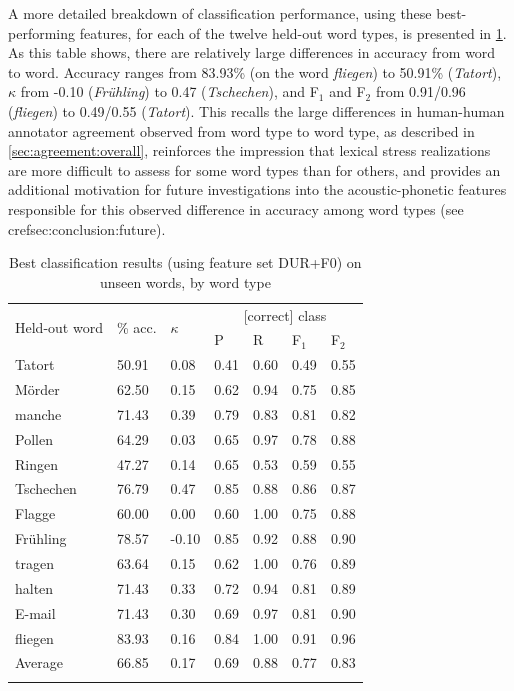 	
	A more detailed breakdown of classification performance, using these best-performing features, for each of the twelve held-out word types, is presented in \cref{tab:results:wordtypes}. As this table shows, there are relatively large differences in accuracy from word to word. Accuracy ranges from 83.93\% (on the word \textit{fliegen}) to 50.91\% (\textit{Tatort}), $\kappa$ from -0.10 (\textit{Fr\"uhling}) to 0.47 (\textit{Tschechen}), and F$_1$ and F$_2$ from 0.91/0.96 (\textit{fliegen}) to 0.49/0.55 (\textit{Tatort}). This recalls the large differences in human-human annotator agreement observed from word type to word type, as described in \cref{sec:agreement:overall}, reinforces the impression that lexical stress realizations are more difficult to assess for some word types than for others, and provides an additional motivation for future investigations into the acoustic-phonetic features responsible for this observed difference in accuracy among word types (see cref{sec:conclusion:future}).
	
	
	
		\begin{table}
			\centering
			\caption[Best classification results on unseen words, by word type]{Best classification results (using feature set DUR+F0) on unseen words, by word type  }
			\begin{tabularx}{\textwidth}{lXXXXXX}			
			\toprule
			\multirow{2}{*}{Held-out word} & \multirow{2}{*}{\% acc.} & \multirow{2}{*}{$\kappa$} & \multicolumn{4}{c}{[correct] class} \\
			\cmidrule(lr){4-7}
			& & & P & R & F$_1$ & F$_2$ \\
			\midrule
Tatort	&	50.91	&	0.08	&	0.41	&	0.60	&	0.49	&	0.55	\\
M\"order	&	62.50	&	0.15	&	0.62	&	0.94	&	0.75	&	0.85	\\
manche	&	71.43	&	0.39	&	0.79	&	0.83	&	0.81	&	0.82	\\
Pollen	&	64.29	&	0.03	&	0.65	&	0.97	&	0.78	&	0.88	\\
Ringen	&	47.27	&	0.14	&	0.65	&	0.53	&	0.59	&	0.55	\\
Tschechen	&	76.79	&	0.47	&	0.85	&	0.88	&	0.86	&	0.87	\\
Flagge	&	60.00	&	0.00	&	0.60	&	1.00	&	0.75	&	0.88	\\
Fr\"uhling	&	78.57	&	-0.10	&	0.85	&	0.92	&	0.88	&	0.90	\\
tragen	&	63.64	&	0.15	&	0.62	&	1.00	&	0.76	&	0.89	\\
halten	&	71.43	&	0.33	&	0.72	&	0.94	&	0.81	&	0.89	\\
E-mail	&	71.43	&	0.30	&	0.69	&	0.97	&	0.81	&	0.90	\\
fliegen	&	83.93	&	0.16	&	0.84	&	1.00	&	0.91	&	0.96	\\
\addlinespace													
Average	&	66.85	&	0.17	&	0.69	&	0.88	&	0.77	&	0.83	\\
			\bottomrule
			\label{tab:results:wordtypes}
			\end{tabularx}
		\end{table}
	
